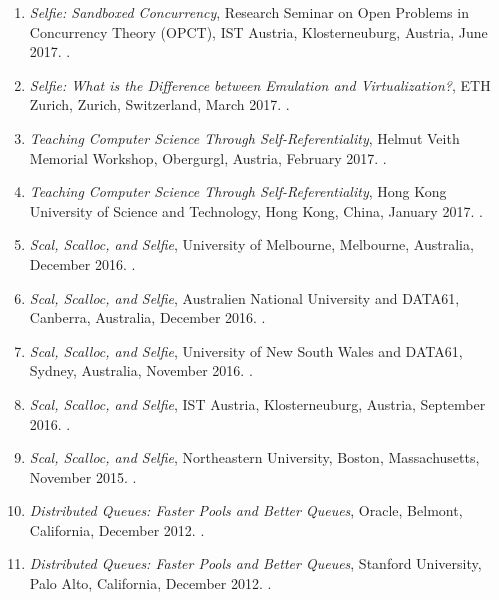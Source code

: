 {\begin{enumerate}
\item \emph{Selfie: Sandboxed Concurrency},
Research Seminar on Open Problems in Concurrency Theory (OPCT), IST Austria, Klosterneuburg, Austria, June 2017.
.

\item \emph{Selfie: What is the Difference between Emulation and Virtualization?},
ETH Zurich, Zurich, Switzerland, March 2017.
.

\item \emph{Teaching Computer Science Through Self-Referentiality},
Helmut Veith Memorial Workshop, Obergurgl, Austria, February 2017.
.

\item \emph{Teaching Computer Science Through Self-Referentiality},
Hong Kong University of Science and Technology, Hong Kong, China, January 2017.
.

\item \emph{Scal, Scalloc, and Selfie},
University of Melbourne, Melbourne, Australia, December 2016.
.

\item \emph{Scal, Scalloc, and Selfie},
Australien National University and DATA61, Canberra, Australia, December 2016.
.

\item \emph{Scal, Scalloc, and Selfie},
University of New South Wales and DATA61, Sydney, Australia, November 2016.
.

\item \emph{Scal, Scalloc, and Selfie},
IST Austria, Klosterneuburg, Austria, September 2016.
.

\item \emph{Scal, Scalloc, and Selfie},
Northeastern University, Boston, Massachusetts, November 2015.
.

\item \emph{Distributed Queues: Faster Pools and Better Queues},
Oracle, Belmont, California, December 2012.
.

\item \emph{Distributed Queues: Faster Pools and Better Queues},
Stanford University, Palo Alto, California, December 2012.
.


\end{enumerate}}
